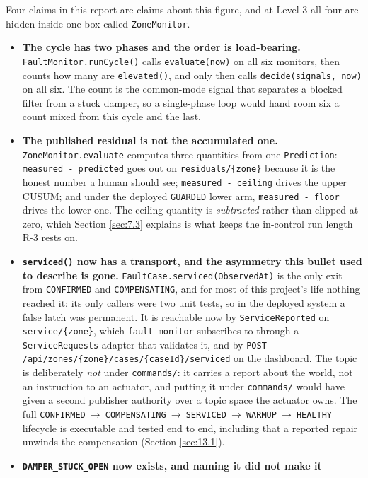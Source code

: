 Four claims in this report are claims about this figure, and at Level 3 all four are hidden
inside one box called \texttt{ZoneMonitor}.

\begin{itemize}
\tightlist
\item \textbf{The cycle has two phases and the order is load-bearing.}
  \texttt{FaultMonitor.runCycle()} calls \texttt{evaluate(now)} on all six monitors, then counts
  how many are \texttt{elevated()}, and only then calls \texttt{decide(signals, now)} on all six.
  The count is the common-mode signal that separates a blocked filter from a stuck damper, so a
  single-phase loop would hand room six a count mixed from this cycle and the last.
\item \textbf{The published residual is not the accumulated one.} \texttt{ZoneMonitor.evaluate}
  computes three quantities from one \texttt{Prediction}: \texttt{measured - predicted} goes out
  on \texttt{residuals/\{zone\}} because it is the honest number a human should see;
  \texttt{measured - ceiling} drives the upper CUSUM; and under the deployed \texttt{GUARDED}
  lower arm, \texttt{measured - floor} drives the lower one. The ceiling quantity is
  \emph{subtracted} rather than clipped at zero, which Section \ref{sec:7.3} explains is what keeps the
  in-control run length R-3 rests on.
\item \textbf{\texttt{serviced()} now has a transport, and the asymmetry this bullet used to
  describe is gone.} \texttt{FaultCase.serviced(ObservedAt)} is the only exit from
  \texttt{CONFIRMED} and \texttt{COMPENSATING}, and for most of this project's life nothing reached
  it: its only callers were two unit tests, so in the deployed system a false latch was permanent.
  It is reachable now by \texttt{ServiceReported} on \texttt{service/\{zone\}}, which
  \texttt{fault-monitor} subscribes to through a \texttt{ServiceRequests} adapter that validates it,
  and by \texttt{POST /api/zones/\{zone\}/cases/\{caseId\}/serviced} on the dashboard. The topic is
  deliberately \emph{not} under \texttt{commands/}: it carries a report about the world, not an
  instruction to an actuator, and putting it under \texttt{commands/} would have given a second
  publisher authority over a topic space the actuator owns. The full
  \texttt{CONFIRMED}~→~\texttt{COMPENSATING}~→~\texttt{SERVICED}~→~\texttt{WARMUP}~→~\texttt{HEALTHY}
  lifecycle is executable and tested end to end, including that a reported repair unwinds the
  compensation (Section \ref{sec:13.1}).
\item \textbf{\texttt{DAMPER\_STUCK\_\allowbreak OPEN} now exists, and naming it did not make it
}
\end{itemize}
